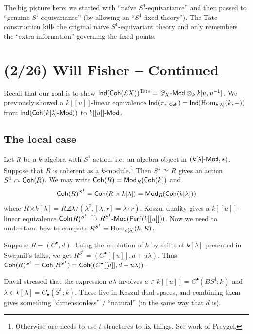 \documentclass{article}
\begin{document}
\begin{rmk}
  The big picture here: we started with ``na\"ive $S^1$-equivariance'' and then passed to ``genuine $S^1$-equivariance'' (by allowing an ``$S^1$-fixed theory'').
  The Tate construction kills the original na\"ive $S^1$-equivariant theory and only remembers the ``extra information'' governing the fixed points.
\end{rmk}

\section{(2/26) Will Fisher -- Continued}

Recall that our goal is to show $\operatorname{\mathsf{Ind}}(\mathsf{Coh}(\mathcal{L} X))^{\mathrm{Tate}} = \mathscr{D}_X\text{-}\mathsf{Mod} \otimes_k k[u, u^{-1}]$.
We previously showed a $k[[u]]$-linear equivalence $\operatorname{\mathsf{Ind}}(\pi_*|_{\mathsf{Coh}}) = \operatorname{\mathsf{Ind}}(\operatorname{Hom}_{k[\lambda]}(k, -))$ from $\operatorname{\mathsf{Ind}}(\mathsf{Coh}(k[\lambda]\text{-}\mathsf{Mod}))$ to $k[[u]]\text{-}\mathsf{Mod}$.

\subsection{The local case}

Let $R$ be a $k$-algebra with $S^1$-action, i.e.\ an algebra object in $(k[\lambda]\text{-}\mathsf{Mod}, \star)$.
Suppose that $R$ is coherent as a $k$-module.\footnote{Otherwise one needs to use $t$-structures to fix things. See work of Preygel.}
Then $S^1 \curvearrowright R$ gives an action $S^1 \curvearrowright \mathsf{Coh}(R)$.
We may write $\mathsf{Coh}(R) = \mathsf{Mod}_R(\mathsf{Coh}(k))$ and
\[
  \mathsf{Coh}(R)^{S^1} = \mathsf{Coh}(R \rtimes k[\lambda]) = \mathsf{Mod}_R(\mathsf{Coh}(k[\lambda]))
\]
where $R \rtimes k[\lambda] = R\angles{\lambda} / (\lambda^2, [\lambda, r] = \lambda \cdot r)$.
Koszul duality gives a $k[[u]]$-linear equivalence $\mathsf{Coh}(R)^{S^1} \xrightarrow{\sim} R^{S^1}\text{-}\mathsf{Mod}(\mathsf{Perf}(k[[u]]))$.
Now we need to understand how to compute $R^{S^1} = \operatorname{Hom}_{k[\lambda]}(k, R)$.

Suppose $R = (C^\bullet, d)$.
Using the resolution of $k$ by shifts of $k[\lambda]$ presented in Swapnil's talks, we get $R^{S^1} = (C^\bullet[[u]], d + u\lambda)$.
Thus $\mathsf{Coh}(R)^{S^1} = \mathsf{Coh}(R^{S^1}) = \mathsf{Coh}((C^\bullet[[u]], d + u\lambda))$.

\begin{rmk}
  David stressed that the expression $u\lambda$ involves $u \in k[[u]] = C^\bullet(BS^1; k)$ and $\lambda \in k[\lambda] = C_\bullet(S^1; k)$.
  These live in Koszul dual spaces, and combining them gives something ``dimensionless'' / ``natural'' (in the same way that $d$ is).
\end{rmk}
\end{document}
